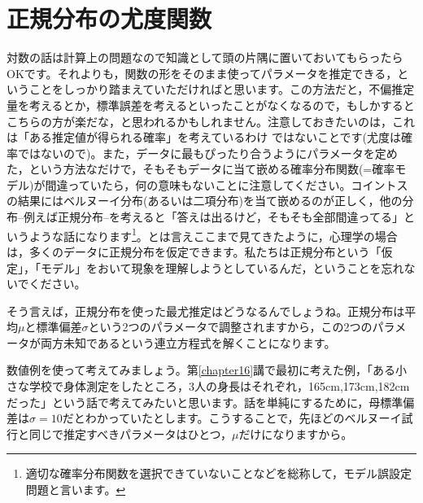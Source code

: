 \documentclass{ltjsarticle}
\begin{document}
\section{正規分布の尤度関数}
対数の話は計算上の問題なので知識として頭の片隅に置いておいてもらったらOKです。それよりも，関数の形をそのまま使ってパラメータを推定できる，ということをしっかり踏まえていただければと思います。この方法だと，不偏推定量を考えるとか，標準誤差を考えるといったことがなくなるので，もしかするとこちらの方が楽だな，と思われるかもしれません。注意しておきたいのは，これは「ある推定値が得られる確率」を考えているわけ
ではないことです(尤度は確率ではないので)。また，データに最もぴったり合うようにパラメータを定めた，という方法なだけで，そもそもデータに当て嵌める確率分布関数(=確率モデル)が間違っていたら，何の意味もないことに注意してください。コイントスの結果にはベルヌーイ分布(あるいは二項分布)を当て嵌めるのが正しく，他の分布--例えば正規分布--を考えると「答えは出るけど，そもそも全部間違ってる」というような話になります\footnote{適切な確率分布関数を選択できていないことなどを総称して，モデル誤設定問題と言います。}。とは言えここまで見てきたように，心理学の場合は，多くのデータに正規分布を仮定できます。私たちは正規分布という「仮定」，「モデル」をおいて現象を理解しようとしているんだ，ということを忘れないでください。

そう言えば，正規分布を使った最尤推定はどうなるんでしょうね。正規分布は平均$\mu$と標準偏差$\sigma$という2つのパラメータで調整されますから，この2つのパラメータが両方未知であるという連立方程式を解くことになります。

数値例を使って考えてみましょう。第\ref{chapter16}講で最初に考えた例，「ある小さな学校で身体測定をしたところ，3人の身長はそれぞれ，165cm,173cm,182cmだった」という話で考えてみたいと思います。話を単純にするために，母標準偏差は$\sigma=10$だとわかっていたとします。こうすることで，先ほどのベルヌーイ試行と同じで推定すべきパラメータはひとつ，$\mu$だけになりますから。
\end{document}
